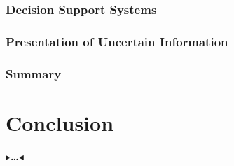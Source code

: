 \documentclass[twoside,11pt,openright]{report}
\newcommand{\todo}[1]{{\color[rgb]{.5,0,0}\textbf{$\blacktriangleright$#1$\blacktriangleleft$}}}
\begin{document}
\subsection{Decision Support Systems}

\subsection{Presentation of Uncertain Information}

\subsection{Summary}



\chapter{Conclusion}
\label{ch:conclusion}

\todo{\dots}



 

\end{document}

